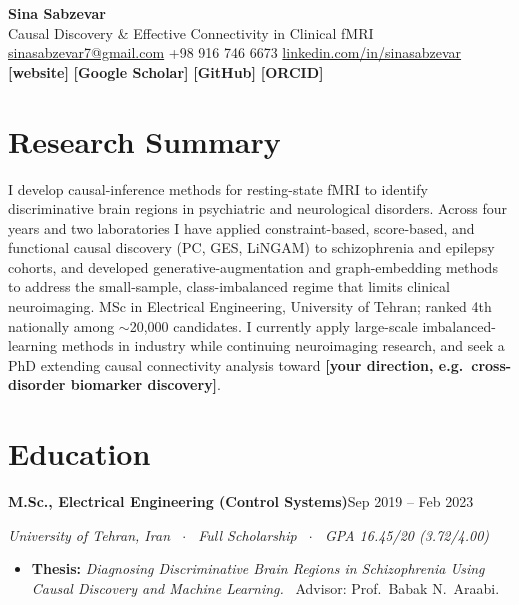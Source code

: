 \documentclass[10pt,a4paper]{article}
\newif\ifdraft
\newcommand{\fillme}[1]{%
  \ifdraft{\color{todo}\bfseries[FILL: #1]}\else\textbf{[#1]}\fi}
\newcommand{\role}[3]{%
  \par\vspace{4pt}%
  \textbf{#1}\hfill{\color{muted}\small #3}\par
  \textit{\color{muted}\small #2}\par\vspace{1.5pt}}
\begin{document}
\begin{center}
  {\LARGE\bfseries\color{accent} Sina Sabzevar}\\[3pt]
  {\large Causal Discovery \& Effective Connectivity in Clinical fMRI}\\[6pt]
  {\small
    \href{mailto:sinasabzevar7@gmail.com}{sinasabzevar7@gmail.com}
    \;\textbar\; +98 916 746 6673
    \;\textbar\; \href{https://linkedin.com/in/sinasabzevar}{linkedin.com/in/sinasabzevar}\\[1.5pt]
    \fillme{website} \;\textbar\; \fillme{Google Scholar} \;\textbar\; \fillme{GitHub} \;\textbar\; \fillme{ORCID}
  }
\end{center}

\section{Research Summary}

I develop causal-inference methods for resting-state fMRI to identify discriminative brain regions
in psychiatric and neurological disorders. Across four years and two laboratories I have applied
constraint-based, score-based, and functional causal discovery (PC, GES, LiNGAM) to schizophrenia
and epilepsy cohorts, and developed generative-augmentation and graph-embedding methods to address
the small-sample, class-imbalanced regime that limits clinical neuroimaging. MSc in Electrical
Engineering, University of Tehran; ranked 4th nationally among $\sim$20,000 candidates. I currently
apply large-scale imbalanced-learning methods in industry while continuing neuroimaging research,
and seek a PhD extending causal connectivity analysis toward
\fillme{your direction, e.g.\ cross-disorder biomarker discovery}.

\section{Education}

\role{M.Sc., Electrical Engineering (Control Systems)}{University of Tehran, Iran \ $\cdot$ \ Full Scholarship \ $\cdot$ \ GPA 16.45/20 (3.72/4.00)}{Sep 2019 -- Feb 2023}
\begin{itemize}
  \item \textbf{Thesis:} \textit{Diagnosing Discriminative Brain Regions in Schizophrenia Using
        Causal Discovery and Machine Learning.} \ Advisor: Prof.\ Babak N.\ Araabi.
\end{itemize}
\end{document}
